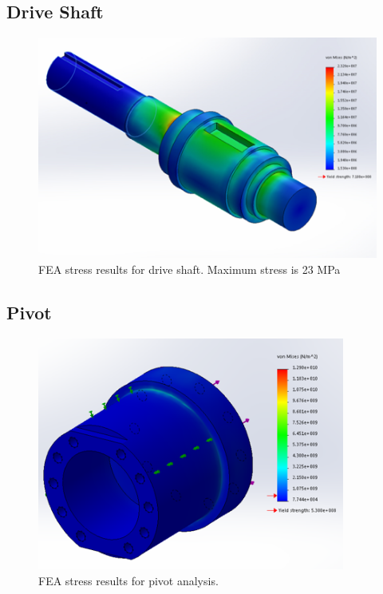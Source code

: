 \subsection{Drive Shaft}\label{sec:drive_shaft_fea}

\begin{figure}[H]
\centering
\includegraphics[width=\textwidth]{images/FEA_driveShaft}
\caption[Drive Shaft FEA Stress Results]{FEA stress results for drive shaft. Maximum stress is 23 MPa}
\label{fig:wheel_shaft_stress_fea}
\end{figure}

\subsection{Pivot}\label{sec:pivot_fea}

\begin{figure}[H]
\centering
\includegraphics[width=0.9\textwidth]{images/FEA_pivotfinal}
\caption[Pivot FEA Stress Results]{FEA stress results for pivot analysis.}
\label{fig:pivot_stress_fea}
\end{figure}

